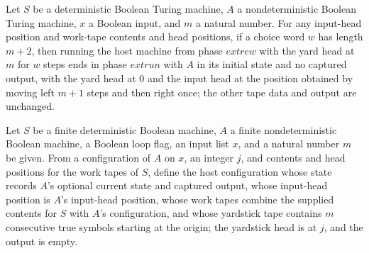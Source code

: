 \begin{theorem}
\label{Turing.ClockHost.rewind_run}
\leanok
{}
Let $S$ be a deterministic Boolean Turing machine, $A$ a nondeterministic Boolean Turing
machine, $x$ a Boolean input, and $m$ a natural number. For any input-head position and
work-tape contents and head positions, if a choice word $w$ has length $m+2$, then
running the host machine from phase $	ext{rew}$ with the yard head at $m$ for $w$ steps
ends in phase $	ext{run}$ with $A$ in its initial state and no captured output, with the
yard head at $0$ and the input head at the position obtained by moving left $m+1$ steps
and then right once; the other tape data and output are unchanged.
\end{theorem}

\begin{definition}
\label{Turing.ClockHost.runCfg}
\leanok
{}
Let $S$ be a finite deterministic Boolean machine, $A$ a finite nondeterministic Boolean
machine, a Boolean loop flag, an input list $x$, and a natural number $m$ be given. From
a configuration of $A$ on $x$, an integer $j$, and contents and head positions for the
work tapes of $S$, define the host configuration whose state records $A$'s optional
current state and captured output, whose input-head position is $A$'s input-head
position, whose work tapes combine the supplied contents for $S$ with $A$'s
configuration, and whose yardstick tape contains $m$ consecutive true symbols starting
at the origin; the yardstick head is at $j$, and the output is empty.
\end{definition}


